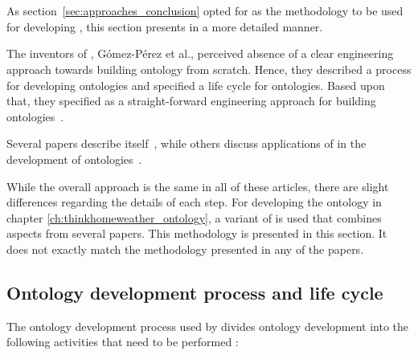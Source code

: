\section{\methontology}

As section~\ref{sec:approaches_conclusion} opted for \methontology as the methodology to be used for developing \thinkhomeweather, this section presents \methontology in a more detailed manner.

\vspace{1em}

The inventors of \methontology, Gómez-Pérez et al., perceived absence of a clear engineering approach towards building ontology from scratch. Hence, they described a process for developing ontologies and specified a life cycle for ontologies. Based upon that, they specified \methontology as a straight-forward engineering approach for building ontologies~\cite{Methontology}.

Several papers describe \methontology itself~\cite{Methontology,Methontology2,ORSD}, while others discuss applications of \methontology in the development of ontologies~\cite{MethontologyLegal,MethontologyChemical}.

While the overall approach is the same in all of these articles, there are slight differences regarding the details of each step. For developing the \thinkhomeweather ontology in chapter \ref{ch:thinkhomeweather_ontology}, a variant of \methontology is used that combines aspects from several papers. This methodology is presented in this section. It does not exactly match the methodology presented in any of the papers.


\subsection{Ontology development process and life cycle}

The ontology development process used by \methontology divides ontology development into the following activities that need to be performed \cite{Methontology}:

